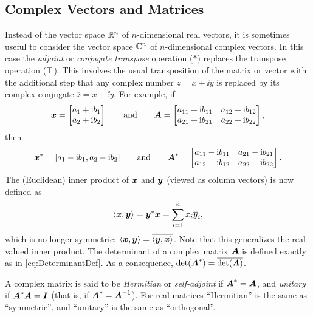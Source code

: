\subsection{Complex Vectors and Matrices}\label{sec:ComplexVectorsMatrices}
Instead of the vector space \(\mathbb{R}^n\) of \(n\)-dimensional real vectors, it is sometimes useful to consider the vector space \(\mathbb{C}^n\) of \(n\)-dimensional complex vectors. In this case the \textit{adjoint} or \textit{conjugate transpose} operation (\(*\)) replaces the transpose operation (\(\top\)). This involves the usual transposition of the matrix or vector with the additional step that any complex number \(z = x + \ii y\) is replaced by its complex conjugate \(\overline{z} = x - \ii y\). For example, if
\begin{equation*}
	\boldsymbol{x} =
	\begin{bmatrix}
		a_1 + \mathrm{i} b_1 \\
		a_2 + \mathrm{i} b_2
	\end{bmatrix}
	\qquad \text{and} \qquad
	\boldsymbol{A} =
	\begin{bmatrix}
		a_{11} + \mathrm{i} b_{11} & a_{12} + \mathrm{i} b_{12} \\
		a_{21} + \mathrm{i} b_{21} & a_{22} + \mathrm{i} b_{22}
	\end{bmatrix},
\end{equation*}
then
\begin{equation*}
	\boldsymbol{x}^* = [a_1 - \mathrm{i} b_1, a_2 - \mathrm{i} b_2]
	\qquad \text{and} \qquad
	\boldsymbol{A}^* =
	\begin{bmatrix}
		a_{11} - \mathrm{i} b_{11} & a_{21} - \mathrm{i} b_{21} \\
		a_{12} - \mathrm{i} b_{12} & a_{22} - \mathrm{i} b_{22}
	\end{bmatrix}.
\end{equation*}
The (Euclidean) inner product of \(\boldsymbol{x}\) and \(\boldsymbol{y}\) (viewed as column vectors) is now defined as
\begin{equation*}
	\langle \boldsymbol{x}, \boldsymbol{y} \rangle = \boldsymbol{y}^* \boldsymbol{x} = \sum_{i=1}^n x_i \overline{y}_i,
\end{equation*}
which is no longer symmetric: \(\langle \boldsymbol{x}, \boldsymbol{y} \rangle = \overline{\langle \boldsymbol{y}, \boldsymbol{x} \rangle}\). Note that this generalizes the real-valued inner product. The determinant of a complex matrix \(\boldsymbol{A}\) is defined exactly as in \eqref{eq:DeterminantDef}. As a consequence, \(\det(\boldsymbol{A}^*) = \overline{\det(\boldsymbol{A})}\).

A complex matrix is said to be \textit{Hermitian} or \textit{self-adjoint} if \(\boldsymbol{A}^* = \boldsymbol{A}\), and \textit{unitary} if \(\boldsymbol{A}^* \boldsymbol{A} = \boldsymbol{I}\) (that is, if \(\boldsymbol{A}^* = \boldsymbol{A}^{-1}\)). For real matrices ``Hermitian'' is the same as ``symmetric'', and ``unitary'' is the same as ``orthogonal''.

